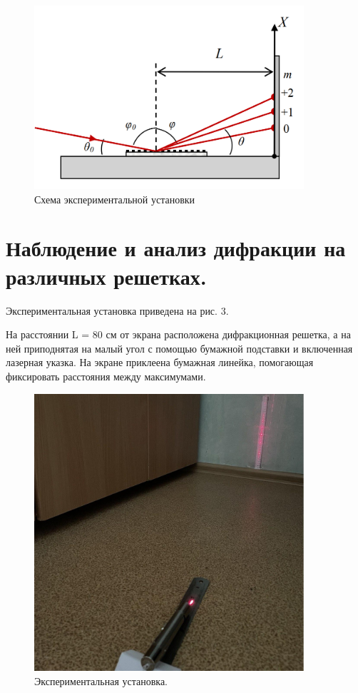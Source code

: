 \documentclass[a4paper,12pt]{article}
\begin{document}
  \begin{figure}[H]
  \begin{center}
    \includegraphics[width=10cm]{ex2.png}
    \caption{Схема экспериментальной установки}
    \label{fig:}
  \end{center}
\end{figure}



\section{Наблюдение и анализ дифракции на различных решетках.} 

Экспериментальная установка приведена на рис. 3.


На расстоянии L = 80 см от экрана расположена дифракционная решетка, а на ней приподнятая на малый угол с помощью бумажной подставки и включенная лазерная указка. На экране приклеена бумажная линейка, помогающая фиксировать расстояния между максимумами. 

  \begin{figure}[H]
  \begin{center}
    \includegraphics[width=10cm]{ex2.jpg}
    \caption{Экспериментальная установка.}
    \label{fig:}
  \end{center}
\end{figure}
\end{document}
